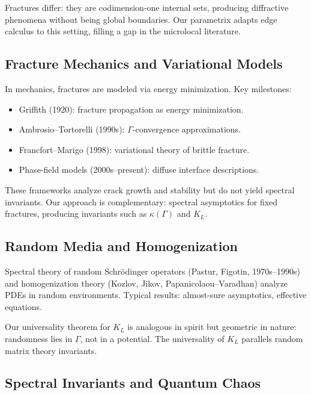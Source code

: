 Fractures differ: they are codimension-one internal sets, producing diffractive
phenomena without being global boundaries. Our parametrix adapts edge calculus
to this setting, filling a gap in the microlocal literature.

\subsection{Fracture Mechanics and Variational Models}

In mechanics, fractures are modeled via energy minimization. Key milestones:

\begin{itemize}
  \item Griffith (1920): fracture propagation as energy minimization.
  \item Ambrosio–Tortorelli (1990s): $\Gamma$-convergence approximations.
  \item Francfort–Marigo (1998): variational theory of brittle fracture.
  \item Phase-field models (2000s–present): diffuse interface descriptions.
\end{itemize}

These frameworks analyze crack growth and stability but do not yield spectral
invariants. Our approach is complementary: spectral asymptotics for fixed
fractures, producing invariants such as $\kappa(\Gamma)$ and $K_L$.

\subsection{Random Media and Homogenization}

Spectral theory of random Schrödinger operators (Pastur, Figotin, 1970s–1990s)
and homogenization theory (Kozlov, Jikov, Papanicolaou–Varadhan) analyze PDEs in
random environments. Typical results: almost-sure asymptotics, effective
equations.

Our universality theorem for $K_L$ is analogous in spirit but geometric in
nature: randomness lies in $\Gamma$, not in a potential. The universality of
$K_L$ parallels random matrix theory invariants.

\subsection{Spectral Invariants and Quantum Chaos}


